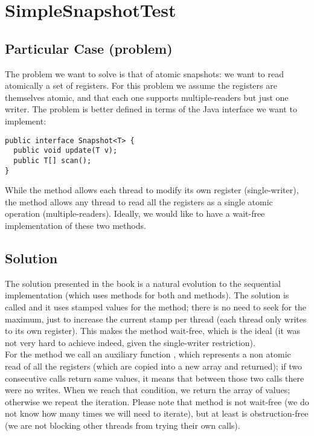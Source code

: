 \newpage
\section{\textbf{SimpleSnapshotTest}}

\subsection{Particular Case (problem)}
The problem we want to solve is that of atomic snapshots: we want to
read atomically a set of registers. For this problem we assume the
registers are themselves atomic, and that each one supports
multiple-readers but just one writer. The problem is better defined in 
terms of the Java interface we want to implement: \\

\begin{lstlisting}[style=nonumbers]
public interface Snapshot<T> {
  public void update(T v);
  public T[] scan();
}
\end{lstlisting}
\hfill

While the method  allows each thread to modify its own
register (single-writer), the  method allows any thread to
read all the registers as a single atomic operation
(multiple-readers). Ideally, we would like to have a wait-free
implementation of these two methods.

\subsection{Solution}
The solution presented in the book is a natural evolution to the
sequential implementation (which uses  methods for
both  and  methods). The solution is called
 and it uses stamped values for the 
method; there is no need to seek for the maximum, just to increase the
current stamp per thread (each thread only writes to its own
register). This makes the  method wait-free, which is the
ideal (it was not very hard to achieve indeed, given the single-writer
restriction). \\

For the  method we call an auxiliary function ,
which represents a non atomic read of all the registers (which are
copied into a new array and returned); if two
consecutive  calls return same values, it means that between
those two calls there were no writes. When we reach that condition, we
return the array of values; otherwise we repeat the iteration. Please
note that  method is not wait-free (we do not know how many
times we will need to iterate), but at least is
obstruction-free (we are not blocking other threads from trying their
own  calls). \\

